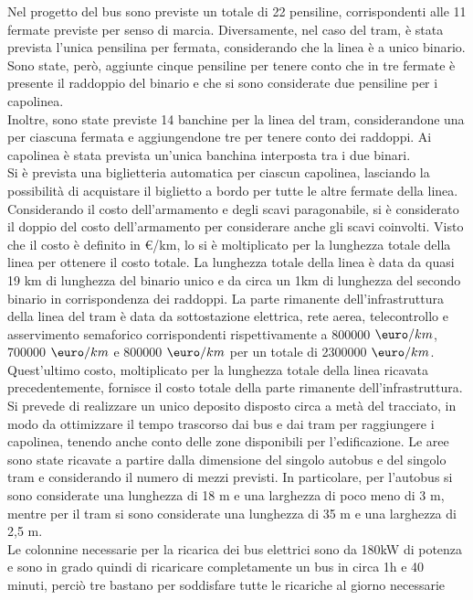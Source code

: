 \documentclass{article}
\begin{document}
Nel progetto del bus sono previste un totale di 22 pensiline, corrispondenti alle 11 fermate previste per senso di marcia. Diversamente, nel caso del tram, è stata prevista l’unica pensilina per fermata, considerando che la linea è a unico binario. Sono state, però, aggiunte cinque pensiline per tenere conto che in tre fermate è presente il raddoppio del binario e che si sono considerate due pensiline per i capolinea.\\
Inoltre, sono state previste 14 banchine per la linea del tram, considerandone una per ciascuna fermata e aggiungendone tre per tenere conto dei raddoppi. Ai capolinea è stata prevista un’unica banchina interposta tra i due binari.\\
Si è prevista una biglietteria automatica per ciascun capolinea, lasciando la possibilità di acquistare il biglietto a bordo per tutte le altre fermate della linea.\\
Considerando il costo dell’armamento e degli scavi paragonabile, si è considerato il doppio del costo dell’armamento per considerare anche gli scavi coinvolti. Visto che il costo è definito in \euro/km, lo si è moltiplicato per la lunghezza totale della linea per ottenere il costo totale. La lunghezza totale della linea è data da quasi 19 km di lunghezza del binario unico e da circa un 1km di lunghezza del secondo binario in corrispondenza dei raddoppi. La parte rimanente dell’infrastruttura della linea del tram è data da sottostazione elettrica, rete aerea, telecontrollo e asservimento semaforico corrispondenti rispettivamente a 800000 $\textup{\euro}/km$, 700000 $\textup{\euro}/km$ e 800000 $\textup{\euro}/km$ per un totale di 2300000 $\textup{\euro}/km$. Quest’ultimo costo, moltiplicato per la lunghezza totale della linea ricavata precedentemente, fornisce il costo totale della parte rimanente dell’infrastruttura.\\ 
Si prevede di realizzare un unico deposito disposto circa a metà del tracciato, in modo da ottimizzare il tempo trascorso dai bus e dai tram per raggiungere i capolinea, tenendo anche conto delle zone disponibili per l'edificazione. Le aree sono state ricavate a partire dalla dimensione del singolo autobus e del singolo tram e considerando il numero di mezzi previsti. In particolare, per l’autobus si sono considerate una lunghezza di 18 m e una larghezza di poco meno di 3 m, mentre per il tram si sono considerate una lunghezza di 35 m e una larghezza di 2,5 m.\\
Le colonnine necessarie per la ricarica dei bus elettrici sono da 180kW di potenza e sono in grado quindi di ricaricare completamente un bus in circa 1h e 40 minuti, perciò tre bastano per soddisfare tutte le ricariche al giorno necessarie
\end{document}
